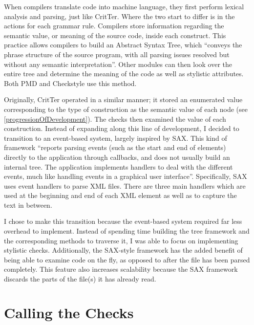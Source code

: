 \documentclass[12pt]{report}
\newcommand{\programName}{CritTer\xspace}
\begin{document}
When compilers translate code into machine language, they first perform lexical analysis and parsing, 
just like \programName. Where the two start to differ is in the actions for each grammar rule. Compilers 
store information regarding the semantic value, or meaning of the source code, inside each construct. 
This practice allows compilers to build an Abstract Syntax Tree, which ``conveys the phrase structure of 
the source program, with all parsing issues resolved but without any semantic 
interpretation''\cite{compiler-implementation}. Other modules can then look over the entire tree and 
determine the meaning of the code as well as stylistic attributes. Both PMD and Checkstyle use this 
method.

Originally, \programName operated in a similar manner; it stored an enumerated value corresponding to 
the type of construction as the semantic value of each node (see \autoref{progressionOfDevelopment}). 
The checks then examined the value of each construction. Instead of expanding along this line of 
development, I decided to transition to an event-based system, largely inspired by 
SAX\cite{saxHomepage}. This kind of framework ``reports parsing events (such as the start and end of 
elements) directly to the application through callbacks, and does not usually build an internal tree. The 
application implements handlers to deal with the different events, much like handling events in a 
graphical user interface''\cite{saxHomepage}. Specifically, SAX uses event handlers to parse XML files. 
There are three main handlers which are used at the beginning and end of each XML element as well as 
to capture the text in between. 

I chose to make this transition because the event-based system required far less overhead to 
implement. Instead of spending time building the tree framework and the corresponding methods to 
traverse it, I was able to focus on implementing stylistic checks. Additionally, the SAX-style framework 
has the added benefit of being able to examine code on the fly, as opposed to after the file has been 
parsed completely. This feature also increases scalability because the SAX framework discards the parts 
of the file(s) it has already read. 

\section{Calling the Checks}
\label{callingTheChecks}
\end{document}
